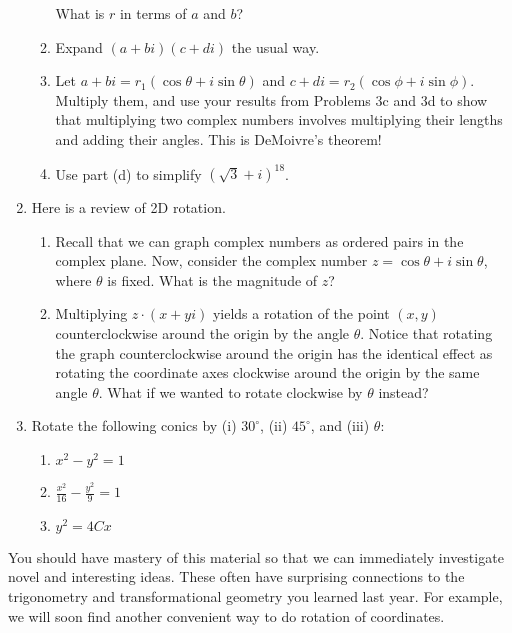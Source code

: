 \documentclass[../gatm.tex]{subfiles}
\begin{document}
\begin{enumerate}
\begin{enumerate}
What is $r$ in terms of $a$ and $b$?
\item Expand $(a+bi)(c+di)$ the usual way.
\item Let $a+bi=r_1(\cos\theta + i\sin\theta)$ and $c+di=r_2(\cos\phi + i\sin\phi)$. Multiply them, and use your results from Problems 3c and 3d to show that multiplying two complex numbers involves multiplying their lengths and adding their angles. This is DeMoivre's theorem!
\item Use part (d) to simplify $(\sqrt{3}+i)^{18}$.
\end{enumerate}
\item Here is a review of 2D rotation.
\begin{enumerate}
\item Recall that we can graph complex numbers as ordered pairs in the complex plane. Now, consider the complex number $z=\cos \theta + i\sin\theta$, where $\theta$ is fixed. What is the magnitude of $z$?
\item Multiplying $z\cdot(x+yi)$ yields a rotation of the point $(x,y)$ counterclockwise around the origin by the angle $\theta$. Notice that rotating the graph counterclockwise around the origin has the identical effect as rotating the coordinate axes clockwise around the origin by the same angle $\theta$. What if we wanted to rotate clockwise by $\theta$ instead?
\end{enumerate}
\item Rotate the following conics by (i) $30^\circ$, (ii) $45^\circ$, and (iii) $\theta$:
\begin{multicols}{3}
\begin{enumerate}
\item $x^2-y^2=1$
\item $\frac{x^2}{16}-\frac{y^2}{9}=1$
\item $y^2=4Cx$
\end{enumerate}
\end{multicols}
\end{enumerate}

You should have mastery of this material so that we can immediately investigate novel and interesting ideas. These often have surprising connections to the trigonometry and transformational geometry you learned last year. For example, we will soon find another convenient way to do rotation of coordinates.
\end{document}

